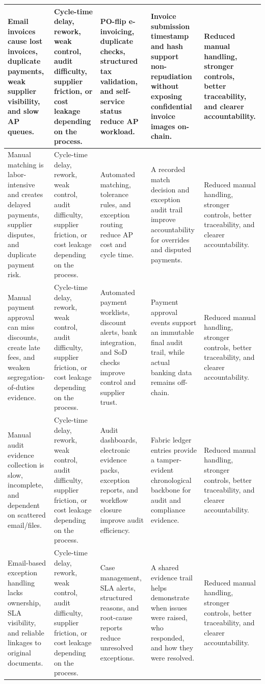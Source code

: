 \documentclass[conference]{IEEEtran}
\begin{document}
\begin{table}[t]
\begin{tabularx}{\textwidth}{|Y|Y|Y|Y|Y|}
Email invoices cause lost invoices, duplicate payments, weak supplier visibility, and slow AP queues. & Cycle-time delay, rework, weak control, audit difficulty, supplier friction, or cost leakage depending on the process. & PO-flip e-invoicing, duplicate checks, structured tax validation, and self-service status reduce AP workload. & Invoice submission timestamp and hash support non-repudiation without exposing confidential invoice images on-chain. & Reduced manual handling, stronger controls, better traceability, and clearer accountability. \\ \hline
Manual matching is labor-intensive and creates delayed payments, supplier disputes, and duplicate payment risk. & Cycle-time delay, rework, weak control, audit difficulty, supplier friction, or cost leakage depending on the process. & Automated matching, tolerance rules, and exception routing reduce AP cost and cycle time. & A recorded match decision and exception audit trail improve accountability for overrides and disputed payments. & Reduced manual handling, stronger controls, better traceability, and clearer accountability. \\ \hline
Manual payment approval can miss discounts, create late fees, and weaken segregation-of-duties evidence. & Cycle-time delay, rework, weak control, audit difficulty, supplier friction, or cost leakage depending on the process. & Automated payment worklists, discount alerts, bank integration, and SoD checks improve control and supplier trust. & Payment approval events support an immutable final audit trail, while actual banking data remains off-chain. & Reduced manual handling, stronger controls, better traceability, and clearer accountability. \\ \hline
Manual audit evidence collection is slow, incomplete, and dependent on scattered email/files. & Cycle-time delay, rework, weak control, audit difficulty, supplier friction, or cost leakage depending on the process. & Audit dashboards, electronic evidence packs, exception reports, and workflow closure improve audit efficiency. & Fabric ledger entries provide a tamper-evident chronological backbone for audit and compliance evidence. & Reduced manual handling, stronger controls, better traceability, and clearer accountability. \\ \hline
Email-based exception handling lacks ownership, SLA visibility, and reliable linkages to original documents. & Cycle-time delay, rework, weak control, audit difficulty, supplier friction, or cost leakage depending on the process. & Case management, SLA alerts, structured reasons, and root-cause reports reduce unresolved exceptions. & A shared evidence trail helps demonstrate when issues were raised, who responded, and how they were resolved. & Reduced manual handling, stronger controls, better traceability, and clearer accountability. \\ \hline

\end{tabularx}
\end{table}
\end{document}
